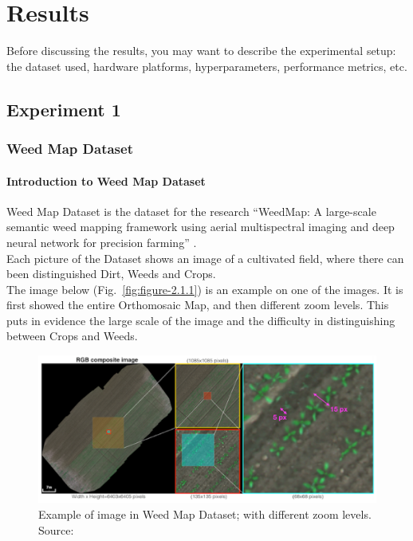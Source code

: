 \chapter{Results}

Before discussing the results, you may want to describe the experimental setup: the dataset used, hardware platforms, hyperparameters, performance metrics, etc.

\section{Experiment 1}





\subsection{Weed Map Dataset}

\subsubsection{Introduction to Weed Map Dataset}

Weed Map Dataset is the dataset for the research “WeedMap: A large-scale semantic weed mapping framework using aerial multispectral imaging and deep neural network for precision farming” \cite{Tesi-2.1}.
\\[0.3cm]Each picture of the Dataset shows an image of a cultivated field, where there can been distinguished Dirt, Weeds and Crops.
\\[0.3cm]The image below (Fig.~\ref{fig:figure-2.1.1}) is an example on one of the images. It is first showed the entire Orthomosaic Map, and then different zoom levels. This puts in evidence the large scale of the image and the difficulty in distinguishing between Crops and Weeds.
\begin{figure}[t]
	\centering
	\includegraphics[width=14cm]{figures/figure-4.1.1.png}
	\caption[Example of image in Weed Map Dataset]{Example of image in Weed Map Dataset; with different zoom levels. Source:~\cite{Tesi-2.1}}
	\label{fig:figure-4.1.1}
\end{figure}

